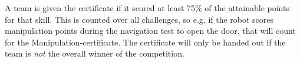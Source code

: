   A team is given the certificate if it scored at least 75\% of the attainable points for that skill.
  This is counted over all challenges, so e.g. if the robot scores manipulation points during the navigation test to open the door, that will count for the Manipulation-certificate.
  The certificate will only be handed out if the team is \emph{not} the overall winner of the competition. 

